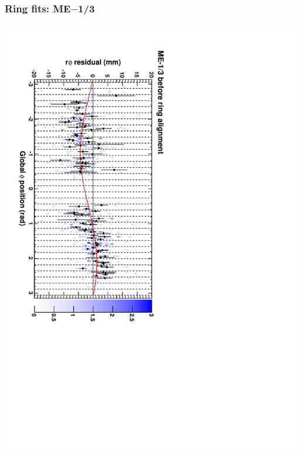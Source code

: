 \documentclass[compress]{beamer}
\begin{document}
\begin{frame}
\frametitle{Ring fits: ME$-$1/3}
\vfill
\begin{columns}
\includegraphics[height=\linewidth, angle=90]{ringfits_before/mem13.pdf}


\end{columns}
\end{frame}
\end{document}
